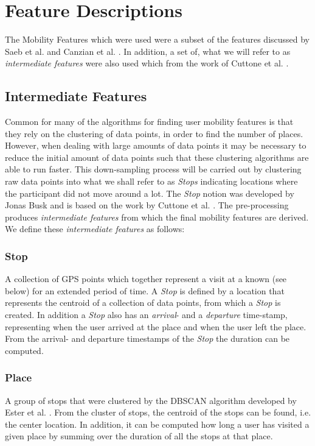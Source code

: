 \section{Feature Descriptions}
The Mobility Features which were used were a subset of the features discussed by Saeb et al. \cite{Saeb2015} and Canzian et al. \cite{Canzian2015}. In addition, a set of, what we will refer to as \textit{intermediate features} were also used which from the work of Cuttone et al. \cite{sparse-location-2014}. 

\subsection{Intermediate Features}
Common for many of the algorithms for finding user mobility features is that they rely on the clustering of data points, in order to find the number of places. However, when dealing with large amounts of data points it may be necessary to reduce the initial amount of data points such that these clustering algorithms are able to run faster. This down-sampling process will be carried out by clustering raw data points into what we shall refer to as \textit{Stops} indicating locations where the participant did not move around a lot. The \textit{Stop} notion was developed by Jonas Busk and is based on the work by Cuttone et al. \cite{sparse-location-2014}. The pre-processing produces \textit{intermediate features} from which the final mobility features are derived. We define these \textit{intermediate features} as follows:

\subsubsection*{Stop}
A collection of GPS points which together represent a visit at a known  (see below) for an extended period of time. A \textit{Stop} is defined by a location that represents the centroid of a collection of data points, from which a \textit{Stop} is created. In addition a \textit{Stop} also has an \textit{arrival}- and a \textit{departure} time-stamp, representing when the user arrived at the place and when the user left the place. From the arrival- and departure timestamps of the \textit{Stop} the duration can be computed.

\subsubsection*{Place}
A group of stops that were clustered by the DBSCAN algorithm developed by Ester et al. \cite{density-based-1996}. From the cluster of stops, the centroid of the stops can be found, i.e. the center location. In addition, it can be computed how long a user has visited a given place by summing over the duration of all the stops at that place.

